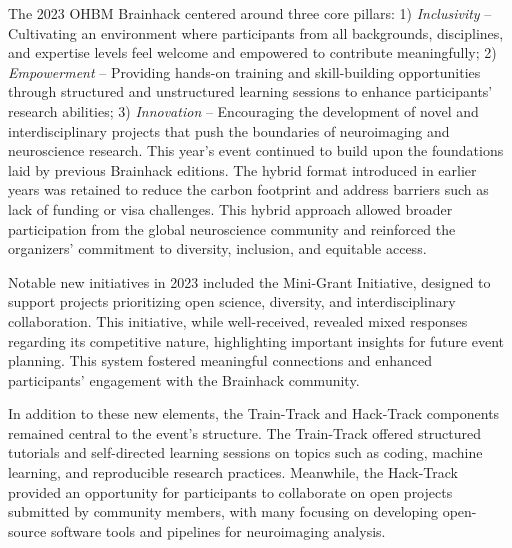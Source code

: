 \documentclass{article}
\begin{document}
The 2023 OHBM Brainhack centered around three core pillars:
1) \emph{Inclusivity} – Cultivating an environment where participants from all backgrounds, disciplines, and expertise levels feel welcome and empowered to contribute meaningfully;
2) \emph{Empowerment} – Providing hands-on training and skill-building opportunities through structured and unstructured learning sessions to enhance participants' research abilities;
3) \emph{Innovation} – Encouraging the development of novel and interdisciplinary projects that push the boundaries of neuroimaging and neuroscience research.
This year’s event continued to build upon the foundations laid by previous Brainhack editions.
The hybrid format introduced in earlier years was retained to reduce the carbon footprint \cite{Epp2023} and address barriers such as lack of funding or visa challenges.
This hybrid approach allowed broader participation from the global neuroscience community and reinforced the organizers' commitment to diversity, inclusion, and equitable access.

Notable new initiatives in 2023 included the Mini-Grant Initiative, designed to support projects prioritizing open science, diversity, and interdisciplinary collaboration.
This initiative, while well-received, revealed mixed responses regarding its competitive nature, highlighting important insights for future event planning.
This system fostered meaningful connections and enhanced participants' engagement with the Brainhack community.

In addition to these new elements, the Train-Track and Hack-Track components remained central to the event's structure.
The Train-Track offered structured tutorials and self-directed learning sessions on topics such as coding, machine learning, and reproducible research practices.
Meanwhile, the Hack-Track provided an opportunity for participants to collaborate on open projects submitted by community members, with many focusing on developing open-source software tools and pipelines for neuroimaging analysis.
\end{document}
